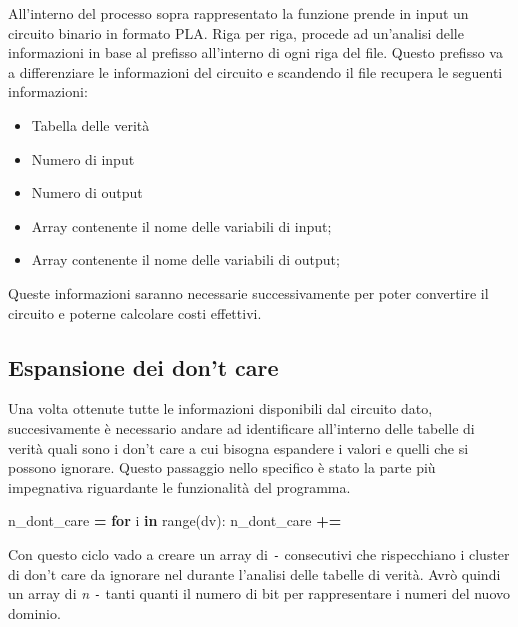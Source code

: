 \documentclass[
  italian,
]{book}
\newenvironment{Shaded}{\begin{snugshade}}{\end{snugshade}}
\newcommand{\BuiltInTok}[1]{#1}
\newcommand{\ControlFlowTok}[1]{\textcolor[rgb]{0.13,0.29,0.53}{\textbf{#1}}}
\newcommand{\KeywordTok}[1]{\textcolor[rgb]{0.13,0.29,0.53}{\textbf{#1}}}
\newcommand{\NormalTok}[1]{#1}
\newcommand{\OperatorTok}[1]{\textcolor[rgb]{0.81,0.36,0.00}{\textbf{#1}}}
\newcommand{\StringTok}[1]{\textcolor[rgb]{0.31,0.60,0.02}{#1}}
\providecommand{\tightlist}{%
  \setlength{\itemsep}{0pt}\setlength{\parskip}{0pt}}
\begin{document}
All'interno del processo sopra rappresentato la funzione prende in input un circuito binario in formato PLA. Riga per riga, procede ad un'analisi delle informazioni in base al prefisso all'interno di ogni riga del file. Questo prefisso va a differenziare le informazioni del circuito e scandendo il file recupera le seguenti informazioni:

\begin{itemize}
\tightlist
\item
  Tabella delle verità
\item
  Numero di input
\item
  Numero di output
\item
  Array contenente il nome delle variabili di input;
\item
  Array contenente il nome delle variabili di output;
\end{itemize}

Queste informazioni saranno necessarie successivamente per poter convertire il circuito e poterne calcolare costi effettivi.

\newpage

\hypertarget{espansione-dei-dont-care}{%
\subsection{Espansione dei don't care}\label{espansione-dei-dont-care}}

Una volta ottenute tutte le informazioni disponibili dal circuito dato, succesivamente è necessario andare ad identificare all'interno delle tabelle di verità quali sono i don't care a cui bisogna espandere i valori e quelli che si possono ignorare. Questo passaggio nello specifico è stato la parte più impegnativa riguardante le funzionalità del programma.

\begin{Shaded}
\begin{Highlighting}[]
\NormalTok{n\_dont\_care }\OperatorTok{=} \StringTok{\textquotesingle{}\textquotesingle{}}
  \ControlFlowTok{for}\NormalTok{ i }\KeywordTok{in} \BuiltInTok{range}\NormalTok{(dv):}
\NormalTok{    n\_dont\_care }\OperatorTok{+=} \StringTok{\textquotesingle{}{-}\textquotesingle{}}
\end{Highlighting}
\end{Shaded}

Con questo ciclo vado a creare un array di \texttt{-} consecutivi che rispecchiano i cluster di don't care da ignorare nel durante l'analisi delle tabelle di verità. Avrò quindi un array di \emph{n} \texttt{-} tanti quanti il numero di bit per rappresentare i numeri del nuovo dominio.
\end{document}
